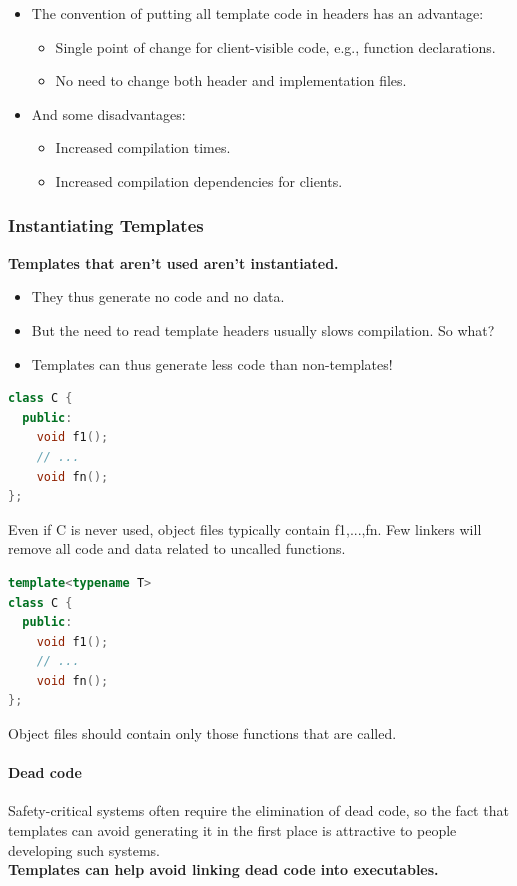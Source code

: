 \begin{itemize}
  \item The convention of putting all template code in headers has an advantage:
  \begin{itemize}
    \item Single point of change for client-visible code, e.g., function declarations.
    \item No need to change both header and implementation files.
  \end{itemize}
  \item And some disadvantages:
  \begin{itemize}
    \item Increased compilation times.
    \item Increased compilation dependencies for clients.
  \end{itemize}
\end{itemize}

\subsubsection{Instantiating Templates}
\textbf{Templates that aren't used aren't instantiated.}
\begin{itemize}
  \item They thus generate no code and no data.
  \item But the need to read template headers usually slows compilation. So what?
  \item Templates can thus generate less code than non-templates!
\end{itemize}
\begin{multicols}{2}
\begin{lstlisting}[language=C++]
class C {
  public:
    void f1();
    // ...
    void fn();
};
\end{lstlisting}
Even if C is never used, object files typically contain f1,...,fn. Few linkers will remove all code and data related to uncalled functions.
\vfill\null
\columnbreak
\begin{lstlisting}[language=C++]
template<typename T>
class C {
  public:
    void f1();
    // ...
    void fn();
};
\end{lstlisting}
Object files should contain only those functions that are called.
\vfill\null
\end{multicols}

\paragraph{Dead code}
Safety-critical systems often require the elimination of dead code, so the fact that templates can avoid generating it in the first place is attractive to people developing such systems.\\
\textbf{Templates can help avoid linking dead code into executables.}

